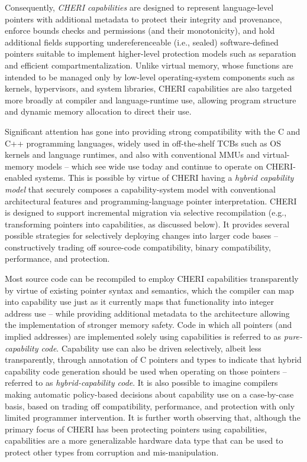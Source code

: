 Consequently, \textit{CHERI capabilities} are designed to represent
language-level pointers with additional metadata to protect their integrity
and provenance, enforce bounds checks and permissions (and their
monotonicity), and hold additional fields supporting undereferenceable 
(i.e., sealed) software-defined
pointers suitable to implement higher-level protection models such as
separation and efficient compartmentalization.
Unlike virtual memory, whose functions are intended to be managed only by
low-level operating-system components such as kernels, hypervisors, and system
libraries, CHERI capabilities are also targeted more broadly at compiler and
language-runtime use, allowing program structure and dynamic memory allocation
to direct their use.

Significant attention has gone into providing strong compatibility with the C
and C++ programming languages, widely used in off-the-shelf TCBs such as
OS kernels and language runtimes, and also with conventional MMUs and
virtual-memory models -- which see wide use today and continue to operate on
CHERI-enabled systems.
This is possible by virtue of CHERI having a \textit{hybrid capability model}
that 
securely
composes a capability-system model with conventional architectural
features and programming-language pointer interpretation.
CHERI is designed to support incremental migration via selective recompilation
(e.g., transforming pointers into capabilities, as discussed below).
It provides several possible strategies for selectively deploying changes
into larger code bases -- constructively trading off source-code
compatibility, binary compatibility, performance, and protection.

Most source code can be recompiled to employ CHERI capabilities transparently
by virtue of existing pointer syntax and semantics, which the compiler can map
into capability use just as it currently maps that functionality into integer
address use -- while providing additional metadata to the architecture
allowing the implementation of stronger memory safety.
Code in which all pointers (and implied addresses) are implemented
solely using capabilities is referred to as \textit{pure-capability code}.
Capability use can also be driven selectively, albeit less transparently,
through annotation of C pointers and types to indicate that hybrid capability
code generation should be used when operating on those pointers -- referred to
as \textit{hybrid-capability code}.
It is also possible to imagine compilers making automatic policy-based
decisions about capability use on a case-by-case basis, based on trading off
compatibility, performance, and protection with only limited programmer
intervention.
It is further worth observing that, although the primary focus of CHERI has
been protecting pointers using capabilities, capabilities are a more
generalizable hardware data type that can be used to protect other types from
corruption and mis-manipulation.


